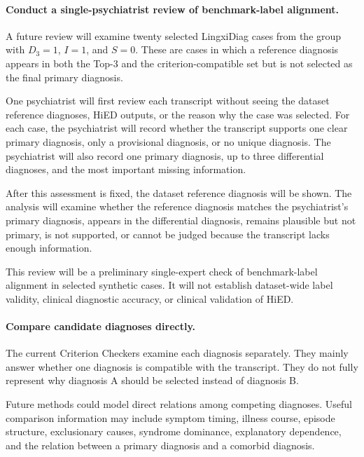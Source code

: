 \documentclass[12pt,a4paper,oneside]{report}
\begin{document}
\paragraph{Conduct a single-psychiatrist review of benchmark-label
alignment.}
\label{sec:clinical-evaluation-plan}
\label{sec:lingxidiag-pilot-review}

A future review will examine twenty selected LingxiDiag cases from the
group with $D_3=1$, $I=1$, and $S=0$. These are cases in which a
reference diagnosis appears in both the Top-3 and the
criterion-compatible set but is not selected as the final primary
diagnosis.

One psychiatrist will first review each transcript without seeing the
dataset reference diagnoses, HiED outputs, or the reason why the case
was selected. For each case, the psychiatrist will record whether the
transcript supports one clear primary diagnosis, only a provisional
diagnosis, or no unique diagnosis. The psychiatrist will also record one
primary diagnosis, up to three differential diagnoses, and the most
important missing information.

After this assessment is fixed, the dataset reference diagnosis will be
shown. The analysis will examine whether the reference diagnosis matches
the psychiatrist's primary diagnosis, appears in the differential
diagnosis, remains plausible but not primary, is not supported, or
cannot be judged because the transcript lacks enough information.

This review will be a preliminary single-expert check of benchmark-label
alignment in selected synthetic cases. It will not establish
dataset-wide label validity, clinical diagnostic accuracy, or clinical
validation of HiED.

\paragraph{Compare candidate diagnoses directly.}

The current Criterion Checkers examine each diagnosis separately. They
mainly answer whether one diagnosis is compatible with the transcript.
They do not fully represent why diagnosis A should be selected instead
of diagnosis B.

Future methods could model direct relations among competing diagnoses.
Useful comparison information may include symptom timing, illness
course, episode structure, exclusionary causes, syndrome dominance,
explanatory dependence, and the relation between a primary diagnosis and
a comorbid diagnosis.
\end{document}
